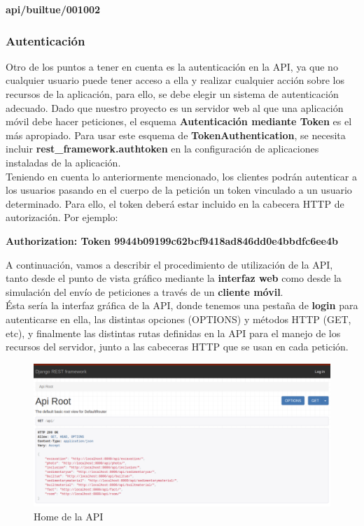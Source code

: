             \begin{center} \textbf{api/builtue/001002} \end{center}

\subsubsection{Autenticación}
Otro de los puntos a tener en cuenta es la autenticación en la API, ya que no cualquier
usuario puede tener acceso a ella y realizar cualquier acción sobre los recursos de la
aplicación, para ello, se debe elegir un sistema de autenticación adecuado. Dado que
nuestro proyecto es un servidor web al que una aplicación móvil debe hacer peticiones,
el esquema \textbf{Autenticación mediante Token} es el más apropiado. Para usar este
esquema de \textbf{TokenAuthentication}, se necesita incluir \textbf{rest\_framework.authtoken}
en la configuración de aplicaciones instaladas de la aplicación.\\

Teniendo en cuenta lo anteriormente mencionado, los clientes podrán autenticar a los usuarios
pasando en el cuerpo de la petición un token vinculado a un usuario determinado. Para
ello, el token deberá estar incluido en la cabecera HTTP de autorización. Por ejemplo:

\begin{center}
    \textbf{Authorization: Token 9944b09199c62bcf9418ad846dd0e4bbdfc6ee4b}
\end{center}

A continuación, vamos a describir el procedimiento de utilización de la API, tanto desde el
punto de vista gráfico mediante la \textbf{interfaz web} como desde la simulación del envío
de peticiones a través de un \textbf{cliente móvil}.\\

Ésta sería la interfaz gráfica de la API, donde tenemos una pestaña de \textbf{login} para
autenticarse en ella, las distintas opciones (OPTIONS) y métodos HTTP (GET, etc), y
finalmente las distintas rutas definidas en la API para el manejo de los recursos del
servidor, junto a las cabeceras HTTP que se usan en cada petición.

        \begin{figure}[H]
            \centering
            \includegraphics[scale=0.25]{imagenes/root-api.png}
            \caption{Home de la API}
            \label{fig:root-api}
        \end{figure}

